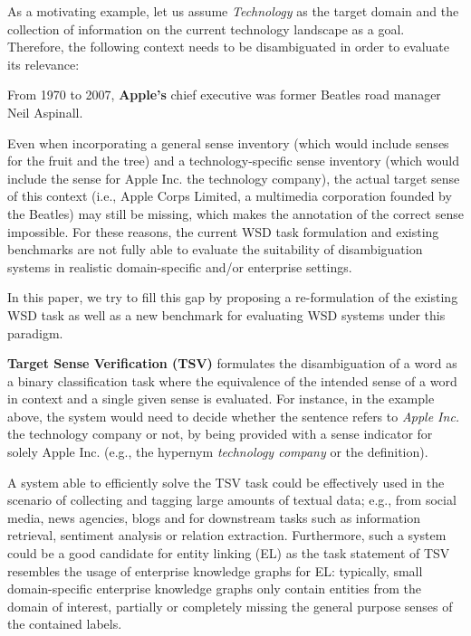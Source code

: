 \documentclass[11pt,a4paper]{article}
\begin{document}
As a motivating example, let us assume \textit{Technology} as the target domain and the collection of information on the current technology landscape as a goal. Therefore, the following context needs to be disambiguated in order to evaluate its relevance: 
\begin{displayquote}
From 1970 to 2007, \textbf{Apple's} chief executive was former Beatles road manager Neil Aspinall.
\end{displayquote}
Even when incorporating a general sense inventory (which would include senses for the fruit and the tree) and a technology-specific sense inventory (which would include the sense for Apple Inc. the technology company), the actual target sense of this context (i.e., Apple Corps Limited, a multimedia corporation founded by the Beatles) may still be missing, which makes the annotation of the correct sense impossible. For these reasons, the current WSD task formulation and existing benchmarks are not fully able to evaluate the suitability of disambiguation systems in realistic domain-specific and/or enterprise settings.



In this paper, we try to fill this gap by proposing a re-formulation of the existing WSD task as well as a new benchmark for evaluating WSD systems under this paradigm. 

\textbf{Target Sense Verification (TSV)} formulates the disambiguation of a word as a binary classification task where the equivalence of the intended sense of a word in context and a single given sense is evaluated. For instance, in the example above, the system would need to decide whether the sentence refers to \textit{Apple Inc.} the technology company or not, by being provided with a sense indicator for solely Apple Inc. (e.g., the hypernym \textit{technology company} or the definition).


A system able to efficiently solve the TSV task 
could be effectively used in the scenario of collecting and tagging large amounts of textual data; e.g., from social media, news agencies, blogs and for downstream tasks such as information retrieval, sentiment analysis or relation extraction. Furthermore, such a system could be a good candidate for entity linking (EL) as the task statement of TSV resembles the usage of enterprise knowledge graphs \cite{Galkin2017} for EL: typically, small domain-specific enterprise knowledge graphs only contain entities from the domain of interest, partially or completely missing the general purpose senses of the contained labels.
\end{document}
